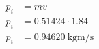 \documentclass{standalone}
\begin{document}
    \(\begin{aligned}
        p_i &= mv\\
        p_i &= 0.51424 \cdot 1.84\\
        p_i &= \SI{0.94620}{\kilo\gram\metre\per\second}
    \end{aligned}\)\\
\end{document}
